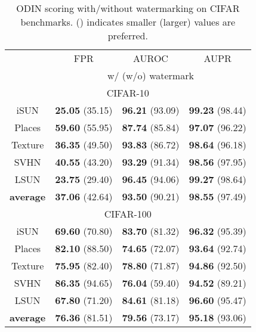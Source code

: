 \documentclass{article}
\begin{document}
\begin{table}[t]
\parbox{.47\linewidth}{
\centering
\caption{ODIN scoring with/without watermarking on CIFAR benchmarks.  () indicates smaller (larger) values are preferred.} \label{tab: odin}
\vspace{5pt}
\scriptsize{
\begin{tabular}{c|ccc}
\toprule[1.5pt]
                   & FPR      & AUROC        & AUPR       \\
                   \cline{2-4} 
\multirow{-2}{*}{} & \multicolumn{3}{c}{w/ (w/o) watermark} \\
\midrule[0.6pt]
\multicolumn{4}{c}{\cellcolor{greyL}CIFAR-10} \\
\midrule[0.6pt]
iSUN               & \textbf{25.05} (35.15) & \textbf{96.21} (93.09) & \textbf{99.23} (98.44) \\ 
Places        & \textbf{59.60} (55.95) & \textbf{87.74} (85.84) & \textbf{97.07} (96.22) \\ 
Texture            & \textbf{36.35} (49.50) & \textbf{93.83} (86.72) & \textbf{98.64} (96.18) \\ 
SVHN               & \textbf{40.55} (43.20) & \textbf{93.29} (91.34) & \textbf{98.56} (97.95) \\ 
LSUN             & \textbf{23.75} (29.40) & \textbf{96.45} (94.06) & \textbf{99.27} (98.64) \\ 
\midrule
\textbf{average}   & \textbf{37.06} (42.64) & \textbf{93.50} (90.21) & \textbf{98.55} (97.49) \\  \midrule[1pt]
\multicolumn{4}{c}{\cellcolor{greyL}CIFAR-100} \\
\midrule[1pt]
iSUN               & \textbf{69.60} (70.80) & \textbf{83.70} (81.32) & \textbf{96.32} (95.39) \\ 
Places        & \textbf{82.10} (88.50) & \textbf{74.65} (72.07) & \textbf{93.64} (92.74) \\ 
Texture            & \textbf{75.95} (82.40) & \textbf{78.80} (71.87) & \textbf{94.86} (92.50) \\ 
SVHN               & \textbf{86.35} (94.65) & \textbf{76.04} (59.40) & \textbf{94.52} (89.21) \\ 
LSUN               & \textbf{67.80} (71.20) & \textbf{84.61} (81.18) & \textbf{96.60} (95.47) \\ 
\midrule
\textbf{average}   & \textbf{76.36} (81.51) & \textbf{79.56} (73.17) & \textbf{95.18} (93.06) \\  \bottomrule[1.5pt]      
\end{tabular}
}}
\end{table}
\end{document}
